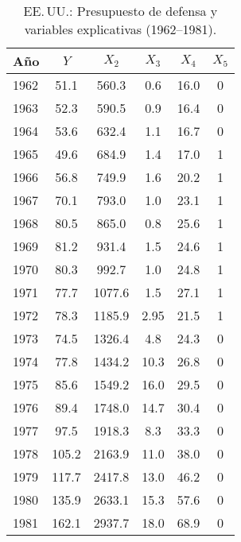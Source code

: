 \documentclass[10pt]{article}
\begin{document}
\begin{table}[H]
    \centering
    \begin{tabular}{lccccc}
        \hline
        \textbf{Año} & $Y$ & $X_2$ & $X_3$ & $X_4$ & $X_5$ \\
        \hline
        1962 &  51.1 &  560.3 &  0.6  & 16.0 & 0 \\
        1963 &  52.3 &  590.5 &  0.9  & 16.4 & 0 \\
        1964 &  53.6 &  632.4 &  1.1  & 16.7 & 0 \\
        1965 &  49.6 &  684.9 &  1.4  & 17.0 & 1 \\
        1966 &  56.8 &  749.9 &  1.6  & 20.2 & 1 \\
        1967 &  70.1 &  793.0 &  1.0  & 23.1 & 1 \\
        1968 &  80.5 &  865.0 &  0.8  & 25.6 & 1 \\
        1969 &  81.2 &  931.4 &  1.5  & 24.6 & 1 \\
        1970 &  80.3 &  992.7 &  1.0  & 24.8 & 1 \\
        1971 &  77.7 & 1077.6 &  1.5  & 27.1 & 1 \\
        1972 &  78.3 & 1185.9 &  2.95 & 21.5 & 1 \\
        1973 &  74.5 & 1326.4 &  4.8  & 24.3 & 0 \\
        1974 &  77.8 & 1434.2 & 10.3  & 26.8 & 0 \\
        1975 &  85.6 & 1549.2 & 16.0  & 29.5 & 0 \\
        1976 &  89.4 & 1748.0 & 14.7  & 30.4 & 0 \\
        1977 &  97.5 & 1918.3 &  8.3  & 33.3 & 0 \\
        1978 & 105.2 & 2163.9 & 11.0  & 38.0 & 0 \\
        1979 & 117.7 & 2417.8 & 13.0  & 46.2 & 0 \\
        1980 & 135.9 & 2633.1 & 15.3  & 57.6 & 0 \\
        1981 & 162.1 & 2937.7 & 18.0  & 68.9 & 0 \\
        \hline
    \end{tabular}
    \caption{EE.\,UU.: Presupuesto de defensa y variables explicativas (1962--1981).}
    \label{tab:defensa_usa}
\end{table}
\end{document}
